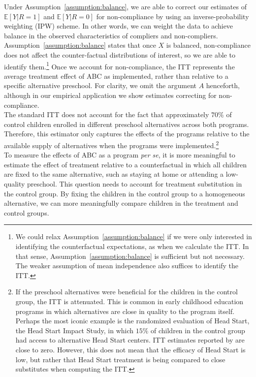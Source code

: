 \noindent Under Assumption~\ref{assumption:balance}, we are able to correct our estimates of $\mathbb{E} \left[ Y | R = 1 \right]$ and $\mathbb{E} \left[ Y | R = 0 \right]$ for non-compliance by using an inverse-probability weighting (IPW) scheme. In other words, we can weight the data to achieve balance in the observed characteristics of compliers and non-compliers. Assumption~\ref{assumption:balance} states that once $X$ is balanced, non-compliance does not affect the counter-factual distributions of interest, so we are able to identify them.\footnote{We could relax Assumption~\ref{assumption:balance} if we were only interested in identifying the counterfactual expectations, as when we calculate the ITT. In that sense, Assumption~\ref{assumption:balance} is sufficient but not necessary. The weaker assumption of mean independence also suffices to identify the ITT.} Once we account for non-compliance, the ITT represents the average treatment effect of ABC as implemented, rather than relative to a specific alternative preschool. For clarity, we omit the argument $A$ henceforth, although in our empirical application we show estimates correcting for non-compliance.\\

\noindent The standard ITT does not account for the fact that approximately $70 \%$ of control children enrolled in different preschool alternatives across both programs. Therefore, this estimator only captures the effects of the programs relative to the available supply of alternatives when the programs were implemented.\footnote{If the preschool alternatives were beneficial for the children in the control group, the ITT is attenuated. This is common in early childhood education programs in which alternatives are close in quality to the program itself. Perhaps the most iconic example is the randomized evaluation of Head Start, the Head Start Impact Study, in which $15\%$ of children in the control group had access to alternative Head Start centers. ITT estimates reported by \cite{Puma_Bell_etal_2010_HeadStartImpact} are close to zero. However, this does not mean that the efficacy of Head Start is low, but rather that Head Start treatment is being compared to close substitutes when computing the ITT.} \\

\noindent To measure the effects of ABC as a program \emph{per se}, it is more meaningful to estimate the effect of treatment relative to a counterfactual in which all children are fixed to the same alternative, such as staying at home or attending a low-quality preschool. This question needs to account for treatment substitution in the control group. By fixing the children in the control group to a homogeneous alternative, we can more meaningfully compare children in the treatment and control groups. \\


